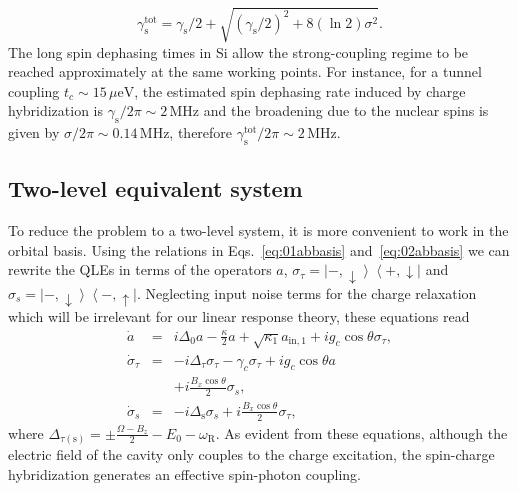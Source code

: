 \documentclass[twocolumn,english,aps,prl,preprint,reprint,showpacs,longbibliography,showkeys]{revtex4-1}
\begin{document}
\begin{equation}
\gamma_{\mathrm{s}}^{\mathrm{tot}}=\gamma_{\mathrm{s}}/2+\sqrt{(\gamma_{\mathrm{s}}/2)^2+8(\ln{2})\sigma^2}
.\end{equation}
The long spin dephasing times in Si allow the strong-coupling regime to be reached approximately at the same working points. For instance, for a tunnel coupling $t_c\sim15\,\mu\mathrm{eV}$, the estimated spin dephasing rate induced by charge hybridization is $\gamma_{\mathrm{s}}/2\pi\sim 2\,\mathrm{MHz}$ and the broadening due to the nuclear spins is given by $\sigma/2\pi\sim 0.14\,\mathrm{MHz}$, therefore $\gamma_{\mathrm{s}}^{\mathrm{tot}}/2\pi\sim 2\,\mathrm{MHz}$.

\subsection{Two-level equivalent system}
\label{subsec:two-level-equivalent}

To reduce the problem to a two-level system, it is more convenient to work in the orbital basis. 
Using the relations in Eqs.~\eqref{eq:01abbasis} and~\eqref{eq:02abbasis} we can rewrite the QLEs
in terms of the operators $a$,
$\sigma_{\tau}=\left|-,\downarrow \right\rangle\left\langle +,\downarrow \right|$ and  $\sigma_{s}=\left|-,\downarrow \right\rangle\left\langle -,\uparrow \right|$. Neglecting input noise terms for the charge relaxation which will be irrelevant for our linear response theory, these equations read
\begin{eqnarray}
\dot{a}  &=&i \Delta_0 a-\frac{\kappa}{2}  a+\sqrt{\kappa_1} a_{\mathrm{in},1}
+i g_c\cos{\theta} \sigma_{\tau}, \label{eq:aequivalent}\\
\dot{\sigma}_{\tau}  &=& -i \Delta_{\tau}\sigma_{\tau}-\gamma_c \sigma_{\tau}   +i g_c\cos{\theta} a\ \nonumber\\
&&+i \frac{B_x\cos{\theta}}{2}\sigma_{s}  ,\label{eq:tau-down}\\
\dot{\sigma}_{s}  &=&-i \Delta_{\mathrm{s}}\sigma_{s} +i  \frac{B_x\cos{\theta}}{2}\sigma_{\tau}
 , \label{eq:s-minus}
\end{eqnarray} 
where $\Delta_{\tau(\mathrm{s})}=\pm\frac{\Omega-B_z}{2}-E_0 -\omega_{\mathrm{R}}$.
As evident from these equations, although the  electric field of the cavity only couples to the charge excitation, the spin-charge hybridization generates an effective spin-photon coupling. 
\end{document}
